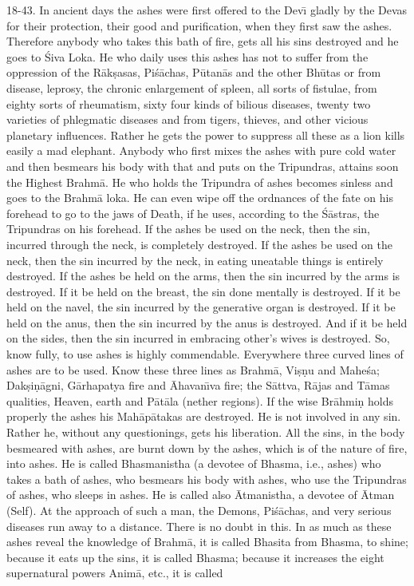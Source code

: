 18-43. In ancient days the ashes were first offered to the Dev\={\i} gladly by the Devas for their protection, their good and purification, when they first saw the ashes. Therefore anybody who takes this bath of fire, gets all his sins destroyed and he goes to \'Siva Loka. He who daily uses this ashes has not to suffer from the oppression of the R\=ak\d{s}asas, Pi\'s\=achas, P\=utan\=as and the other Bh\=utas or from disease, leprosy, the chronic enlargement of spleen, all sorts of fistulae, from eighty sorts of rheumatism, sixty four kinds of bilious diseases, twenty two varieties of phlegmatic diseases and from tigers, thieves, and other vicious planetary influences. Rather he gets the power to suppress all these as a lion kills easily a mad elephant. Anybody who first mixes the ashes with pure cold water and then besmears his body with that and puts on the Tripundras, attains soon the Highest Brahm\=a. He who holds the Tripundra of ashes becomes sinless and goes to the Brahm\=a loka. He can even wipe off the ordnances of the fate on his forehead to go to the jaws of Death, if he uses, according to the \'S\=astras, the Tripundras on his forehead. If the ashes be used on the neck, then the sin, incurred through the neck, is completely destroyed. If the ashes be used on the neck, then the sin incurred by the neck, in eating uneatable things is entirely destroyed. If the ashes be held on the arms, then the sin incurred by the arms is destroyed. If it be held on the breast, the sin done mentally is destroyed. If it be held on the navel, the sin incurred by the generative organ is destroyed. If it be held on the anus, then the sin incurred by the anus is destroyed. And if it be held on the sides, then the sin incurred in embracing other's wives is destroyed. So, know fully, to use ashes is highly commendable. Everywhere three curved lines of ashes are to be used. Know these three lines as Brahm\=a, Vi\d{s}\d{n}u and Mahe\'sa; Dak\d{s}i\d{n}\=agni, G\=arhapatya fire and \=Ahavan\={\i}va fire; the S\=attva, R\=ajas and T\=amas qualities, Heaven, earth and P\=at\=ala (nether regions). If the wise Br\=ahmi\d{n} holds properly the ashes his Mah\=ap\=atakas are destroyed. He is not involved in any sin. Rather he, without any questionings, gets his liberation. All the sins, in the body besmeared with ashes, are burnt down by the ashes, which is of the nature of fire, into ashes. He is called Bhasmanistha (a devotee of Bhasma, i.e., ashes) who takes a bath of ashes, who besmears his body with ashes, who use the Tripundras of ashes, who sleeps in ashes. He is called also \=Atmanistha, a devotee of \=Atman (Self). At the approach of such a man, the Demons, Pi\'s\=achas, and very serious diseases run away to a distance. There is no doubt in this. In as much as these ashes reveal the knowledge of Brahm\=a, it is called Bhasita from Bhasma, to shine; because it eats up the sins, it is called Bhasma; because it increases the eight supernatural powers Anim\=a, etc., it is called

